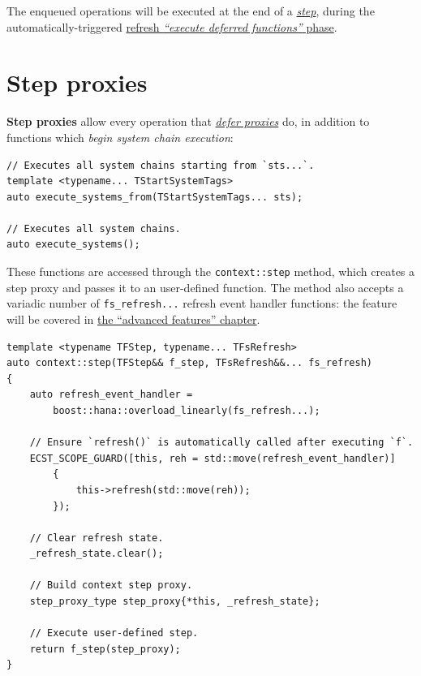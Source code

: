 \documentclass[twoside, 12pt, a4paper, openany]{book}
\begin{document}
The enqueued operations will be executed at the end of a
\protect\hyperlink{step_stage}{\emph{step}}, during the
automatically-triggered \protect\hyperlink{flow_exec_dfuncs}{refresh
\emph{``execute deferred functions''} phase}.

\hypertarget{proxies_step}{\section{Step proxies}\label{proxies_step}}

\textbf{Step proxies} allow every operation that
\protect\hyperlink{proxies_defer}{\emph{defer proxies}} do, in addition
to functions which \emph{begin system chain execution}:

\begin{verbatim}
// Executes all system chains starting from `sts...`.
template <typename... TStartSystemTags>
auto execute_systems_from(TStartSystemTags... sts);

// Executes all system chains.
auto execute_systems();
\end{verbatim}

These functions are accessed through the
\texttt{context::step}
method, which creates a step proxy and passes it to an user-defined
function. The method also accepts a variadic number of
\texttt{fs_refresh...}
refresh event handler functions: the feature will be covered in
\protect\hyperlink{chap_advfeats}{the ``advanced features'' chapter}.

\begin{verbatim}
template <typename TFStep, typename... TFsRefresh>
auto context::step(TFStep&& f_step, TFsRefresh&&... fs_refresh)
{
    auto refresh_event_handler =
        boost::hana::overload_linearly(fs_refresh...);

    // Ensure `refresh()` is automatically called after executing `f`.
    ECST_SCOPE_GUARD([this, reh = std::move(refresh_event_handler)]
        {
            this->refresh(std::move(reh));
        });

    // Clear refresh state.
    _refresh_state.clear();

    // Build context step proxy.
    step_proxy_type step_proxy{*this, _refresh_state};

    // Execute user-defined step.
    return f_step(step_proxy);
}
\end{verbatim}
\end{document}
